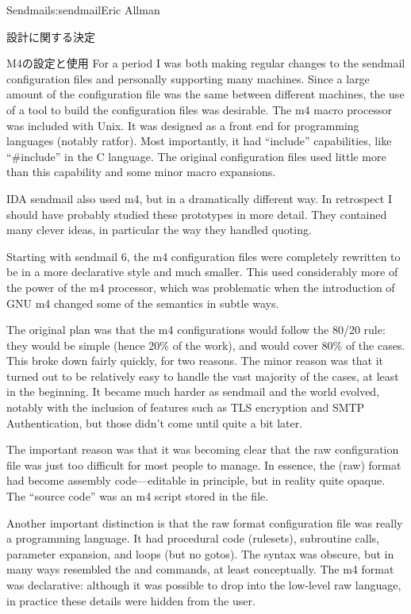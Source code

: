 \begin{aosachapter}{Sendmail}{s:sendmail}{Eric Allman}
\begin{aosasect1}{設計に関する決定}
\begin{aosasect2}{M4の設定と使用}
For a period I was both making regular changes to the sendmail
configuration files and personally supporting many machines. Since a
large amount of the configuration file was the same between different
machines, the use of a tool to build the configuration files was
desirable. The m4 macro processor was included with Unix. It was
designed as a front end for programming languages (notably
ratfor). Most importantly, it had ``include'' capabilities, like
``\#include'' in the C language.
The original configuration files used little
more than this capability and some minor macro expansions.

IDA sendmail also used m4, but in a dramatically different way. In
retrospect I should have probably studied these prototypes in more
detail. They contained many clever ideas, in particular the way they
handled quoting.

Starting with sendmail 6, the m4 configuration files were completely
rewritten to be in a more declarative style and much smaller. This
used considerably more of the power of the m4 processor, which was
problematic when the introduction of GNU m4 changed some of
the semantics in subtle ways.

The original plan was that the m4
configurations would follow the 80/20 rule: they would be simple
(hence 20\% of the work), and would cover 80\% of the cases. This broke
down fairly quickly, for two reasons.
The minor reason was that it turned out to be relatively easy to
handle the vast majority of the cases, at least in the beginning. It
became much harder as sendmail and the world evolved, notably with the
inclusion of features such as TLS encryption and SMTP Authentication,
but those didn't come until quite a bit later.

The important reason was that it was becoming clear that the raw
configuration file was just too difficult for most people to
manage. In essence, the  (raw) format had become assembly
code---editable in principle, but in reality quite opaque. The
``source code'' was an m4 script stored in the  file.

Another important distinction is that the raw format configuration
file was really a programming language. It had procedural code
(rulesets), subroutine calls, parameter expansion, and loops (but no
gotos). The syntax was obscure, but in many ways resembled
the  and  commands, at
least conceptually. The m4 format was declarative: although it was
possible to drop into the low-level raw language, in practice these
details were hidden from the user.


\end{aosasect2}
\end{aosasect1}
\end{aosachapter}
